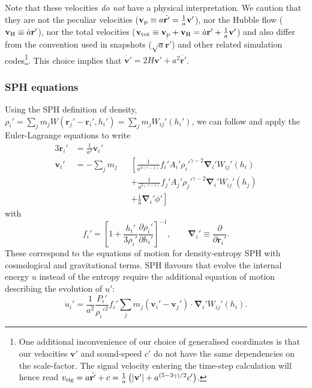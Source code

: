 Note that these velocities \emph{do not} have a physical
interpretation. We caution that they are not the peculiar velocities
($\mathbf{v}_{\rm p} \equiv a\dot{\mathbf{r}'} =
\frac{1}{a}\mathbf{v}'$), nor the Hubble flow
($\mathbf{v}_{\rm H} \equiv \dot{a}\mathbf{r}'$), nor the total
velocities
($\mathbf{v}_{\rm tot} \equiv \mathbf{v}_{\rm p} + \mathbf{v}_{\rm H}
= \dot{a}\mathbf{r}' + \frac{1}{a}\mathbf{v}'$) and also differ from
the convention used in \gadget snapshots
($\sqrt{a} \dot{\mathbf{r}'}$) and other related simulation
codes\footnote{One additional inconvenience of our choice of
  generalised coordinates is that our velocities $\mathbf{v}'$ and
  sound-speed $c'$ do not have the same dependencies on the
  scale-factor. The signal velocity entering the time-step calculation
  will hence read
  $v_{\rm sig} = a\dot{\mathbf{r}'} + c = \frac{1}{a} \left(
    |\mathbf{v}'| + a^{(5 - 3\gamma)/2}c'\right)$.}.
This choice implies that $\dot{\mathbf{v}'} = 2H\mathbf{v}' +  a^2\ddot{\mathbf{r}'}$.

\subsubsection{SPH equations}

Using the SPH definition of density,
$\rho_i' = \sum_jm_jW(\mathbf{r}_{j}'-\mathbf{r}_{i}',h_i') =
\sum_jm_jW_{ij}'(h_i')$, we can follow \cite{Price2012} and apply the
Euler-Lagrange equations to write
\begin{alignat}{3}
  \dot{\mathbf{r}}_i'&= \frac{1}{a^2} \mathbf{v}_i'&  \label{eq:cosmo_eom_r} \\
  \dot{\mathbf{v}}_i' &= -\sum_j m_j &&\left[\frac{1}{a^{3(\gamma-1)}}f_i'A_i'\rho_i'^{\gamma-2}\mathbf{\nabla}_i'W_{ij}'(h_i)\right. \nonumber\\
  &   && + \left. \frac{1}{a^{3(\gamma-1)}}f_j'A_j'\rho_j'^{\gamma-2}\mathbf{\nabla}_i'W_{ij}'(h_j)\right. \nonumber\\
  &   && + \left. \frac{1}{a}\mathbf{\nabla}_i'\phi'\right] \label{eq:cosmo_eom_v}
\end{alignat}
with
\begin{equation}
    f_i' = \left[1 + \frac{h_i'}{3\rho_i'}\frac{\partial
      \rho_i'}{\partial h_i'}\right]^{-1}, \qquad \mathbf{\nabla}_i'
  \equiv \frac{\partial}{\partial \mathbf{r}_{i}'}. \nonumber
\end{equation}
These correspond to the equations of motion for density-entropy SPH
\citep[e.g. eq. 14 of][]{Hopkins2013} with cosmological and
gravitational terms. SPH flavours that evolve the internal energy $u$ instead of the
entropy require the additional equation of motion describing the evolution of
$u'$:
\begin{equation}
  \dot{u}_i' = \frac{1}{a^2}\frac{P_i'}{\rho_i'^2} f_i'\sum_jm_j\left(\mathbf{v}_i' -
    \mathbf{v}_j'\right)\cdot\mathbf{\nabla}_i'W_{ij}'(h_i).
  \label{eq:cosmo_eom_u}
\end{equation}


